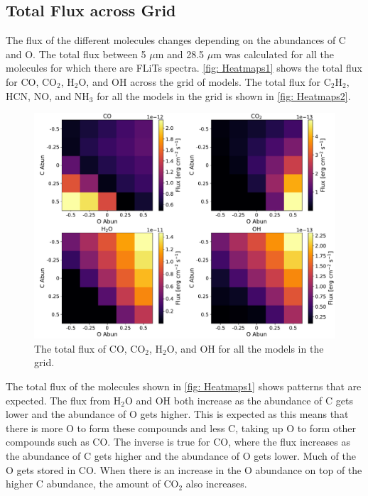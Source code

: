 \documentclass[oneside, single, authoryear, semicolon, 12pt]{lion-msc}
\newcommand{\4}{$_4$}
\newcommand{\3}{$_3$}
\newcommand{\2}{$_2$}
\begin{document}
\subsection{Total Flux across Grid}
The flux of the different molecules changes depending on the abundances of C and O. The total flux between 5 $\mu$m and 28.5 $\mu$m was calculated for all the molecules for which there are FLiTs spectra. \autoref{fig: Heatmaps1} shows the total flux for CO, CO\2, H\2O, and OH across the grid of models. The total flux for C\2H\2, HCN, NO, and NH\3 for all the models in the grid is shown in \autoref{fig: Heatmaps2}. 

\begin{figure}[H]
    \centering
    \includegraphics[width=\linewidth]{Figures/Heatmaps1.pdf}
    \caption{The total flux of CO, CO\2, H\2O, and OH for all the models in the grid.}
    \label{fig: Heatmaps1}
\end{figure}

The total flux of the molecules shown in \autoref{fig: Heatmaps1} shows patterns that are expected. The flux from H\2O and OH both increase as the abundance of C gets lower and the abundance of O gets higher. This is expected as this means that there is more O to form these compounds and less C, taking up O to form other compounds such as CO. The inverse is true for CO, where the flux increases as the abundance of C gets higher and the abundance of O gets lower. Much of the O gets stored in CO. When there is an increase in the O abundance on top of the higher C abundance, the amount of CO\2 also increases. 
\end{document}
